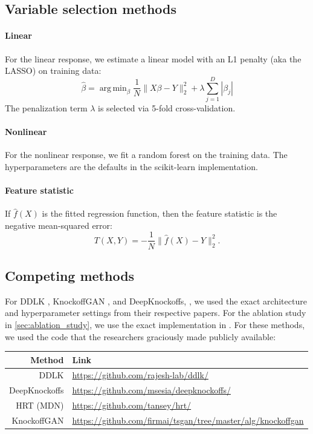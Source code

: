 \documentclass{article}
\DeclareMathOperator*{\argmin}{arg\,min}
\begin{document}
\subsection{Variable selection methods}

\paragraph{Linear}
For the linear response, we estimate a linear model with an L1 penalty (aka the LASSO) on training data:
\begin{equation}
  \hat \beta = \argmin_{\beta} \frac{1}{N} \|X\beta - Y\|_{2}^{2} + \lambda \sum_{j=1}^{D} |\beta_{j}|
\end{equation}
The penalization term $\lambda$ is selected via 5-fold cross-validation.

\paragraph{Nonlinear} For the nonlinear response, we fit a random forest on the training data.
The hyperparameters are the defaults in the scikit-learn implementation.

\paragraph{Feature statistic}
If $\hat f(X)$ is the fitted regression function, then the feature statistic is the negative mean-squared error:
\begin{equation*}
  T(X, Y) = - \frac 1 N \|\hat f(X) - Y \|_{2}^{2} .
\end{equation*}

\subsection{Competing methods}
\label{sec:appendix_competing_methods}
For DDLK \citep{sudarshanDeepDirectLikelihood2020}, KnockoffGAN \citep{jordon2018knockoffgan}, and DeepKnockoffs, \citep{romanoDeepKnockoffs2018}, we used the exact architecture and hyperparameter settings from their respective papers.
For the ablation study in \cref{sec:ablation_study}, we use the exact implementation in \citet{tanseyHoldoutRandomizationTest2019}.
For these methods, we used the code that the researchers graciously made publicly available:

\begin{center}
\begin{tabular}{r|l}
  Method & Link \\
  \midrule
DDLK & \url{https://github.com/rajesh-lab/ddlk/} \\
  DeepKnockoffs & \url{https://github.com/msesia/deepknockoffs/} \\
  HRT (MDN) & \url{https://github.com/tansey/hrt/} \\
  KnockoffGAN & \url{https://github.com/firmai/tsgan/tree/master/alg/knockoffgan} \\
\end{tabular}
\end{center}
\end{document}
